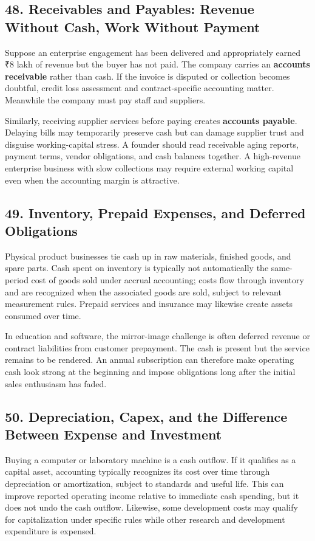 \subsection*{48. Receivables and Payables: Revenue Without Cash, Work Without Payment}

Suppose an enterprise engagement has been delivered and appropriately earned ₹8 lakh of revenue but the buyer has not paid. The company carries an \textbf{accounts receivable} rather than cash. If the invoice is disputed or collection becomes doubtful, credit loss assessment and contract-specific accounting matter. Meanwhile the company must pay staff and suppliers.

Similarly, receiving supplier services before paying creates \textbf{accounts payable}. Delaying bills may temporarily preserve cash but can damage supplier trust and disguise working-capital stress. A founder should read receivable aging reports, payment terms, vendor obligations, and cash balances together. A high-revenue enterprise business with slow collections may require external working capital even when the accounting margin is attractive.

\subsection*{49. Inventory, Prepaid Expenses, and Deferred Obligations}

Physical product businesses tie cash up in raw materials, finished goods, and spare parts. Cash spent on inventory is typically not automatically the same-period cost of goods sold under accrual accounting; costs flow through inventory and are recognized when the associated goods are sold, subject to relevant measurement rules. Prepaid services and insurance may likewise create assets consumed over time.

In education and software, the mirror-image challenge is often deferred revenue or contract liabilities from customer prepayment. The cash is present but the service remains to be rendered. An annual subscription can therefore make operating cash look strong at the beginning and impose obligations long after the initial sales enthusiasm has faded.

\subsection*{50. Depreciation, Capex, and the Difference Between Expense and Investment}

Buying a computer or laboratory machine is a cash outflow. If it qualifies as a capital asset, accounting typically recognizes its cost over time through depreciation or amortization, subject to standards and useful life. This can improve reported operating income relative to immediate cash spending, but it does not undo the cash outflow. Likewise, some development costs may qualify for capitalization under specific rules while other research and development expenditure is expensed.

